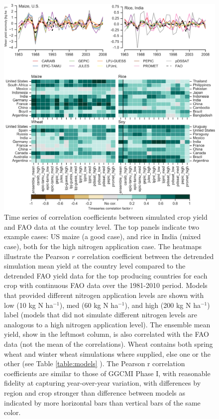 \documentclass[gmd, manuscript]{copernicus} %
\begin{document}
\begin{figure}[ht]
    \centering
    \includegraphics[width=14cm]{figures/Agformet_validation.png}
    \caption{Time series of correlation coefficients between simulated crop yield and FAO data \citep{FAOSTAT} at the country level. 
    The top panels indicate two example cases: US maize (a good case), and rice in India (mixed case), both for the high nitrogen application case. 
    The heatmaps illustrate the Pearson $r$ correlation coefficient between the detrended simulation mean yield at the country level compared to the detrended FAO yield data for the top producing countries for each crop with continuous FAO data over the 1981-2010 period. 
    Models that provided different nitrogen application levels are shown with low (10 kg N ha$^{-1}$), med (60 kg N ha$^{-1}$), and high (200 kg N ha$^{-1}$) label (models that did not simulate different nitrogen levels are analogous to a high nitrogen application level). 
    The ensemble mean yield, show in the leftmost column, is also correlated with the FAO data (not the mean of the correlations). 
    Wheat contains both spring wheat and winter wheat simulations where supplied, else one or the other (see Table \ref{table:models} ). 
    The Pearson r correlation coefficients are similar to those of GGCMI Phase I, with reasonable fidelity at capturing year-over-year variation, with differences by region and crop stronger than difference between models as indicated by more horizontal bars than vertical bars of the same color.}
    \label{fig:simulation_val}
\end{figure}
\end{document}
